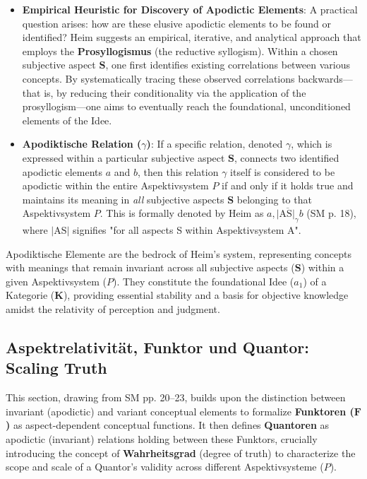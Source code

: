 \documentclass[12pt]{article}
\newcommand{\kategorie}{\bm{K}}
\newcommand{\conceptualsyndrome}{a}
\newcommand{\aspektivsystem}{P}
\newcommand{\funktor}{\bm{F}}
\begin{document}
\begin{itemize}
    \item \textbf{Empirical Heuristic for Discovery of Apodictic Elements}: A practical question arises: how are these elusive apodictic elements to be found or identified? Heim suggests an empirical, iterative, and analytical approach that employs the \textbf{Prosyllogismus} (the reductive syllogism). Within a chosen subjective aspect \( \mathbf{S} \), one first identifies existing correlations between various concepts. By systematically tracing these observed correlations backwards—that is, by reducing their conditionality via the application of the prosyllogism—one aims to eventually reach the foundational, unconditioned elements of the Idee. 
    \item \textbf{Apodiktische Relation (\( \gamma \))}: If a specific relation, denoted \( \gamma \), which is expressed within a particular subjective aspect \( \mathbf{S} \), connects two identified apodictic elements \( a \) and \( b \), then this relation \( \gamma \) itself is considered to be apodictic within the entire Aspektivsystem \( \aspektivsystem \) if and only if it holds true and maintains its meaning in \textit{all} subjective aspects \( \mathbf{S} \) belonging to that Aspektivsystem \( \aspektivsystem \). This is formally denoted by Heim as \( a, \overline{|\mathrm{AS}|_{\gamma}} b \) (SM p. 18), where \(|\mathrm{AS}|\) signifies "for all aspects S within Aspektivsystem A".
\end{itemize}

Apodiktische Elemente are the bedrock of Heim's system, representing concepts with meanings that remain invariant across all subjective aspects (\(\mathbf{S}\)) within a given Aspektivsystem (\(\aspektivsystem\)). They constitute the foundational Idee (\(\conceptualsyndrome_1\)) of a Kategorie (\(\kategorie\)), providing essential stability and a basis for objective knowledge amidst the relativity of perception and judgment.

\subsection{Aspektrelativität, Funktor und Quantor: Scaling Truth}
\label{sec:quantor}

This section, drawing from SM pp. 20--23, builds upon the distinction between invariant (apodictic) and variant conceptual elements to formalize \textbf{Funktoren (\(\funktor\))} as aspect-dependent conceptual functions. It then defines \textbf{Quantoren} as apodictic (invariant) relations holding between these Funktors, crucially introducing the concept of \textbf{Wahrheitsgrad} (degree of truth) to characterize the scope and scale of a Quantor's validity across different Aspektivsysteme (\(\aspektivsystem\)).
\end{document}
